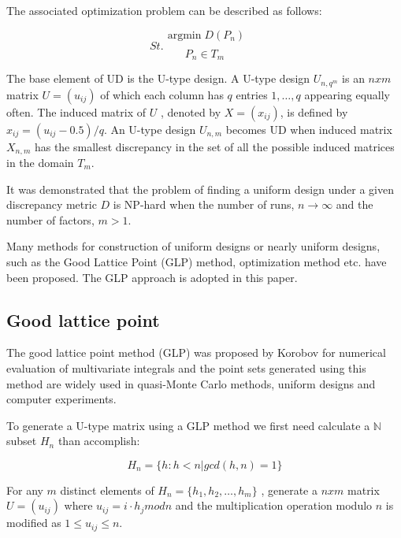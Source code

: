 \documentclass[a4paper,10pt]{llncs}
\begin{document}
The associated optimization problem can be described as follows:

\begin{equation}
 \mathop{\mathrm{argmin}} D(P_n)
\end{equation}
 $\quad \quad \quad \quad \quad \quad \quad \quad \quad \quad \quad \quad \quad St.$ %
 \begin{equation}
 P_n \in T_m  
 \end{equation}

The base element of UD is the U-type design. A U-type design $U_{n,q^m}$ is an $n x m$ matrix $U = (u_{ij} )$ of which each column has $q$ entries $1, \dots, q$ appearing equally often. The induced matrix of $U$ , denoted by $X = (x_{ij})$, is defined by $x_{ij} = (u_{ij} - 0.5)/q$.
An U-type design $U_{n,m}$ becomes UD when induced matrix $X_{n,m}$ has the smallest discrepancy in the set of all the possible induced matrices in the domain $T_m$.

It was demonstrated that the problem of finding a uniform design under a given discrepancy metric $D$ is NP-hard when the number of runs, $n \rightarrow \infty$ and the number of factors, $m > 1$\cite{fang2003note}.

Many methods for construction of uniform designs or nearly uniform designs, such as the Good Lattice Point (GLP) method, optimization method etc. have been proposed. The GLP approach is adopted in this paper.

\subsection{Good lattice point}

The good lattice point method (GLP) was proposed by Korobov for numerical evaluation of multivariate integrals\cite{wang2002historical} and the point sets generated using this method are widely used in quasi-Monte Carlo methods, uniform designs and computer experiments.

To generate a U-type matrix using a GLP method we first need calculate a $\mathbb{N}$ subset $H_n$ than accomplish:

\begin{equation}
 H_n =\{ h:h<n | gcd(h,n)=1\}
\end{equation}

For any $m$ distinct elements of $H_n=\{h_1 ,h_2 , \dots ,h_m\}$ , generate a $n x m$ matrix $U=(u_{ij})$ where $u_{ij}=i \cdot h_j mod n$ and the multiplication operation modulo $n$ is modified as $1 \leq u_{ij} \leq n$.
\end{document}
